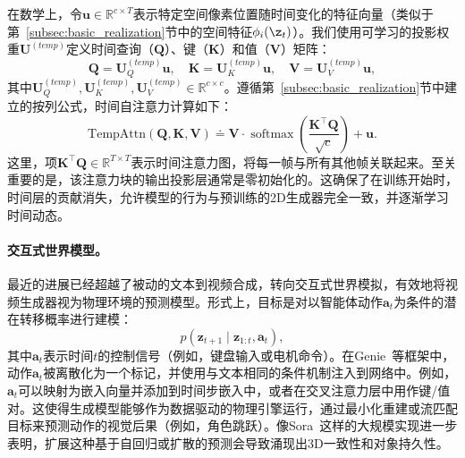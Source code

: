 \documentclass[../../book-main_zh.tex]{subfiles}
\begin{document}
在数学上，令$\boldsymbol{u} \in \mathbb{R}^{c \times T}$表示特定空间像素位置随时间变化的特征向量（类似于第~\ref{subsec:basic_realization}节中的空间特征$\phi_i(\z_t)$）。我们使用可学习的投影权重$\boldsymbol{U}^{(temp)}$定义时间查询（$\boldsymbol{Q}$）、键（$\boldsymbol{K}$）和值（$\boldsymbol{V}$）矩阵：
\begin{equation}
    \boldsymbol{Q} = \boldsymbol{U}^{(temp)}_Q \boldsymbol{u}, \quad \boldsymbol{K} = \boldsymbol{U}^{(temp)}_K \boldsymbol{u}, \quad \boldsymbol{V} = \boldsymbol{U}^{(temp)}_V \boldsymbol{u},
\end{equation}
其中$\boldsymbol{U}^{(temp)}_{Q}, \boldsymbol{U}^{(temp)}_{K}, \boldsymbol{U}^{(temp)}_{V} \in \mathbb{R}^{c \times c}$。遵循第~\ref{subsec:basic_realization}节中建立的按列公式，时间自注意力计算如下：
\begin{equation}
    \text{TempAttn}(\boldsymbol{Q}, \boldsymbol{K}, \boldsymbol{V}) \doteq \boldsymbol{V} \cdot \operatorname{softmax}\left( \frac{\boldsymbol{K}^\top \boldsymbol{Q}}{\sqrt{c}} \right) + \boldsymbol{u}.
\end{equation}
这里，项$\boldsymbol{K}^\top \boldsymbol{Q} \in \mathbb{R}^{T \times T}$表示时间注意力图，将每一帧与所有其他帧关联起来。至关重要的是，该注意力块的输出投影层通常是零初始化的。这确保了在训练开始时，时间层的贡献消失，允许模型的行为与预训练的2D生成器完全一致，并逐渐学习时间动态。

\paragraph{交互式世界模型。}
最近的进展已经超越了被动的文本到视频合成，转向交互式世界模拟，有效地将视频生成器视为物理环境的预测模型。形式上，目标是对以智能体动作$\boldsymbol{a}_t$为条件的潜在转移概率进行建模：
\begin{equation}
    p(\boldsymbol{z}_{t+1} \mid \boldsymbol{z}_{1:t}, \boldsymbol{a}_t),
\end{equation}
其中$\boldsymbol{a}_t$表示时间$t$的控制信号（例如，键盘输入或电机命令）。在Genie~\citep{bruce2024genie}等框架中，动作$\boldsymbol{a}_t$被离散化为一个标记，并使用与文本相同的条件机制注入到网络中。例如，$\boldsymbol{a}_t$可以映射为嵌入向量并添加到时间步嵌入中，或者在交叉注意力层中用作键/值对。这使得生成模型能够作为数据驱动的物理引擎运行，通过最小化重建或流匹配目标来预测动作的视觉后果（例如，角色跳跃）。像Sora~\citep{openai2024sora}这样的大规模实现进一步表明，扩展这种基于自回归或扩散的预测会导致涌现出3D一致性和对象持久性。
\end{document}
